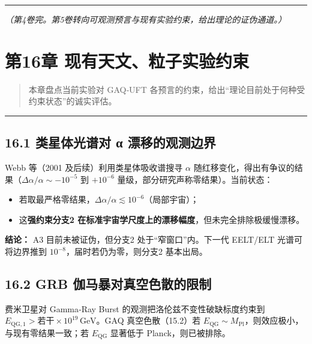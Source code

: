 \begin{center}\rule{0.5\linewidth}{0.5pt}\end{center}

\emph{（第4卷完。第5卷转向可观测预言与现有实验约束，给出理论的证伪通道。）}

\section{第16章
现有天文、粒子实验约束}\label{ux7b2c16ux7ae0-ux73b0ux6709ux5929ux6587ux7c92ux5b50ux5b9eux9a8cux7ea6ux675f-1}

\begin{quote}
本章盘点当前实验对 GAQ‑UFT
各预言的约束，给出``理论目前处于何种受约束状态''的诚实评估。
\end{quote}

\begin{center}\rule{0.5\linewidth}{0.5pt}\end{center}

\subsection{16.1 类星体光谱对 α
漂移的观测边界}\label{ux7c7bux661fux4f53ux5149ux8c31ux5bf9-ux3b1-ux6f02ux79fbux7684ux89c2ux6d4bux8fb9ux754c}

Webb 等（2001 及后续）利用类星体吸收谱搜寻 \(\alpha\)
随红移变化，得出有争议的结果（\(\Delta\alpha/\alpha\sim -10^{-5}\) 到
\(+10^{-6}\) 量级，部分研究声称零结果）。当前状态：

\begin{itemize}
\tightlist
\item
  若取最严格零结果，\(\Delta\alpha/\alpha\lesssim 10^{-6}\)（局部宇宙）；
\item
  这\textbf{强约束分支2
  在标准宇宙学尺度上的漂移幅度}，但未完全排除极缓慢漂移。
\end{itemize}

\textbf{结论：} A3 目前未被证伪，但分支2 处于``窄窗口''内。下一代
EELT/ELT 光谱可将边界推到 \(10^{-8}\)，届时若仍为零，则分支2 基本出局。

\subsection{16.2 GRB
伽马暴对真空色散的限制}\label{grb-ux4f3dux9a6cux66b4ux5bf9ux771fux7a7aux8272ux6563ux7684ux9650ux5236}

费米卫星对 Gamma‑Ray Burst 的观测把洛伦兹不变性破缺标度约束到
\(E_{\mathrm{QG},1}>\mathrm{若干}\times10^{19}\,\mathrm{GeV}\)。GAQ
真空色散（15.2）若
\(E_{\mathrm{QG}}\sim M_{\mathrm{Pl}}\)，则效应极小，与现有零结果一致；若
\(E_{\mathrm{QG}}\) 显著低于 Planck，则已被排除。

